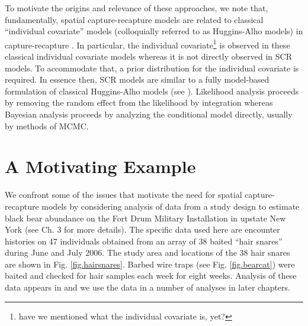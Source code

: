 To motivate the origins and
relevance of these approaches, we note that, fundamentally, spatial
capture-recapture models are related to classical ``individual
covariate'' models (colloquially referred to as Huggins-Alho 
models) in capture-recapture \citep{huggins:1989, alho:1990}.
In particular, the individual covariate\footnote{have we mentioned
  what the individual covariate is, yet?} is observed in these classical
individual covariate models  whereas
it is not directly observed in SCR models.
To accommodate that, a prior distribution for the individual
covariate is required. In essence then, SCR models are similar to a
fully model-based formulation of classical Huggins-Alho models (see
\citet{royle:2009}). Likelihood analysis \citep{borchers_efford:2008} proceeds by removing the
random effect from the likelihood by integration whereas Bayesian
analysis \citep{royle_young:2008} proceeds by analyzing the conditional model directly, usually
by methods of MCMC.




\section{ A Motivating Example }
 
We confront some of the issues that motivate the need for spatial
capture-recapture models by considering analysis of data from a study
design to estimate black bear abundance on the Fort Drum Military
Installation in upstate New York (see Ch. 3 for more details). The
specific data used here are encounter histories on 47 individuals
obtained from an array of 38 baited ``hair snares'' during June and
July 2006. The study area and locations of the 38 hair snares are
shown in Fig. \ref{fig.hairsnares}.  Barbed wire traps (see
Fig. \ref{fig.bearcat}) were baited and checked for hair samples each
week for eight weeks.  Analysis of these data appears in
\citet{gardner_etal:2010} and we use the data in a number of analyses
in later chapters.

